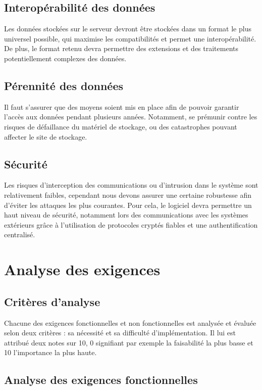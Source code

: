 \documentclass[a4paper, 11pt, final]{article}
\begin{document}
\subsection{Interopérabilité des données}%
Les données stockées sur le serveur devront être stockées dans un format le
plus universel possible, qui maximise les compatibilités et permet une interopérabilité.
De plus, le format retenu devra permettre des extensions et des traitements
potentiellement complexes des données.

\subsection{Pérennité des données}
Il faut s'assurer que des moyens soient mis en place afin de pouvoir garantir l'accès aux
données pendant plusieurs années. Notamment, se prémunir contre les risques de défaillance
du matériel de stockage, ou des catastrophes pouvant affecter le site de stockage.

\subsection{Sécurité}
Les risques d'interception des communications ou d'intrusion dans le système sont relativement faibles,
cependant nous devons assurer une certaine robustesse afin d'éviter les attaques les plus courantes.
Pour cela, le logiciel devra permettre un haut niveau de sécurité, notamment lors des communications
avec les systèmes extérieurs grâce à l'utilisation de protocoles cryptés fiables et une authentification centralisé.

\section{Analyse des exigences}

\subsection{Critères d'analyse}
Chacune des exigences fonctionnelles et non fonctionnelles est analysée et évaluée selon deux critères : sa nécessité et sa difficulté d'implémentation. Il lui est attribué deux notes sur 10, 0 signifiant par exemple la faisabilité la plus basse et 10 l'importance la plus haute.

\subsection{Analyse des exigences fonctionnelles}
\end{document}
